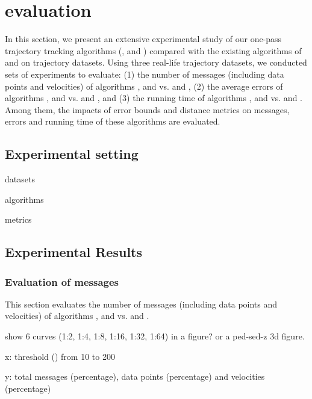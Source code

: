 \section{evaluation}
\label{sec-exp}

In this section, we present an extensive experimental study of our one-pass trajectory tracking algorithms (\citt, \sitt and \bitt) compared with the
existing algorithms of \ldrh and \grts on trajectory datasets. Using three real-life trajectory datasets, we conducted sets of experiments to evaluate:
(1) the number of messages (including data points and velocities) of algorithms \citt, \sitt and \bitt vs. \ldrh and \grts, 
(2) the average errors of algorithms \citt, \sitt and \bitt vs. \ldrh and \grts, and
(3) the running time of algorithms \citt, \sitt and \bitt vs. \ldrh and \grts. 
Among them, the impacts of error bounds and distance metrics on messages, errors and running time of these algorithms are evaluated. 

\subsection{Experimental setting}

datasets

algorithms

metrics


\subsection{Experimental Results}

\subsubsection{Evaluation of messages}
This section evaluates the number of messages (including data points and velocities) of algorithms \citt, \sitt and \bitt vs. \ldrh and \grts.


show 6 curves (1:2, 1:4, 1:8, 1:16, 1:32, 1:64) in a figure? or a ped-sed-z 3d figure.

x: threshold (\ped) from 10 to 200

y: total messages (percentage), data points (percentage) and velocities (percentage)


